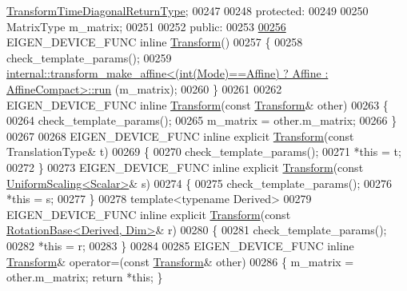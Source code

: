 \begin{DoxyCode}
      \hyperlink{group___geometry___module_a51af5e8d8d9d9bfec091ff8aa5b7845a}{TransformTimeDiagonalReturnType};
00247 
00248 \textcolor{keyword}{protected}:
00249 
00250   MatrixType m\_matrix;
00251 
00252 \textcolor{keyword}{public}:
00253 
\hyperlink{group___geometry___module_a79b94ccee0f7871610fa2fa084e0fd59}{00256}   EIGEN\_DEVICE\_FUNC \textcolor{keyword}{inline} \hyperlink{group___geometry___module_a79b94ccee0f7871610fa2fa084e0fd59}{Transform}()
00257   \{
00258     check\_template\_params();
00259     
      \hyperlink{struct_eigen_1_1internal_1_1transform__make__affine}{internal::transform\_make\_affine<(int(Mode)==Affine) ? Affine : AffineCompact>::run}
      (m\_matrix);
00260   \}
00261 
00262   EIGEN\_DEVICE\_FUNC \textcolor{keyword}{inline} \hyperlink{group___geometry___module_class_eigen_1_1_transform}{Transform}(\textcolor{keyword}{const} \hyperlink{group___geometry___module_class_eigen_1_1_transform}{Transform}& other)
00263   \{
00264     check\_template\_params();
00265     m\_matrix = other.m\_matrix;
00266   \}
00267 
00268   EIGEN\_DEVICE\_FUNC \textcolor{keyword}{inline} \textcolor{keyword}{explicit} \hyperlink{group___geometry___module_class_eigen_1_1_transform}{Transform}(\textcolor{keyword}{const} TranslationType& t)
00269   \{
00270     check\_template\_params();
00271     *\textcolor{keyword}{this} = t;
00272   \}
00273   EIGEN\_DEVICE\_FUNC \textcolor{keyword}{inline} \textcolor{keyword}{explicit} \hyperlink{group___geometry___module_class_eigen_1_1_transform}{Transform}(\textcolor{keyword}{const} 
      \hyperlink{class_eigen_1_1_uniform_scaling}{UniformScaling<Scalar>}& s)
00274   \{
00275     check\_template\_params();
00276     *\textcolor{keyword}{this} = s;
00277   \}
00278   \textcolor{keyword}{template}<\textcolor{keyword}{typename} Derived>
00279   EIGEN\_DEVICE\_FUNC \textcolor{keyword}{inline} \textcolor{keyword}{explicit} \hyperlink{group___geometry___module_class_eigen_1_1_transform}{Transform}(\textcolor{keyword}{const} 
      \hyperlink{class_eigen_1_1_rotation_base}{RotationBase<Derived, Dim>}& r)
00280   \{
00281     check\_template\_params();
00282     *\textcolor{keyword}{this} = r;
00283   \}
00284 
00285   EIGEN\_DEVICE\_FUNC \textcolor{keyword}{inline} \hyperlink{group___geometry___module_class_eigen_1_1_transform}{Transform}& operator=(\textcolor{keyword}{const} \hyperlink{group___geometry___module_class_eigen_1_1_transform}{Transform}& other)
00286   \{ m\_matrix = other.m\_matrix; \textcolor{keywordflow}{return} *\textcolor{keyword}{this}; \}

\end{DoxyCode}
